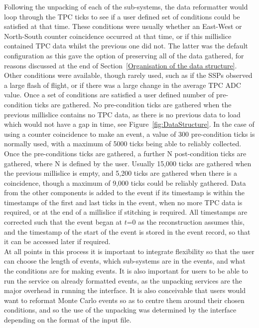 Following the unpacking of each of the sub-systems, the data reformatter would loop through the TPC ticks to see if a user defined set of conditions could be satisfied at that time. These conditions were usually whether an East-West or North-South counter coincidence occurred at that time, or if this millislice contained TPC data whilst the previous one did not. The latter was the default configuration as this gave the option of preserving all of the data gathered, for reasons discussed at the end of Section~\ref{Organisation of the data structure}. Other conditions were available, though rarely used, such as if the SSPs observed a large flash of flight, or if there was a large change in the average TPC ADC value. Once a set of conditions are satisfied a user defined number of pre-condition ticks are gathered. No pre-condition ticks are gathered when the previous millislice contains no TPC data, as there is no previous data to load which would not have a gap in time, see Figure~\ref{fig:DataStructure}. In the case of using a counter coincidence to make an event, a value of 300 pre-condition ticks is normally used, with a maximum of 5000 ticks being able to reliably collected. Once the pre-conditions ticks are gathered, a further N post-condition ticks are gathered, where N is defined by the user. Usually 15,000 ticks are gathered when the previous millislice is empty, and 5,200 ticks are gathered when there is a coincidence, though a maximum of 9,000 ticks could be reliably gathered. Data from the other components is added to the event if its timestamp is within the timestamps of the first and last ticks in the event, when no more TPC data is required, or at the end of a millislice if stitching is required. All timestamps are corrected such that the event began at $t$=0 as the reconstruction assumes this, and the timestamp of the start of the event is stored in the event record, so that it can be accessed later if required. \\

At all points in this process it is important to integrate flexibility so that the user can choose the length of events, which sub-systems are in the events, and what the conditions are for making events. It is also important for users to be able to run the service on already formatted events, as the unpacking services are the major overhead in running the interface. It is also conceivable that users would want to reformat Monte Carlo events so as to centre them around their chosen conditions, and so the use of the unpacking was determined by the interface depending on the format of the input file.

